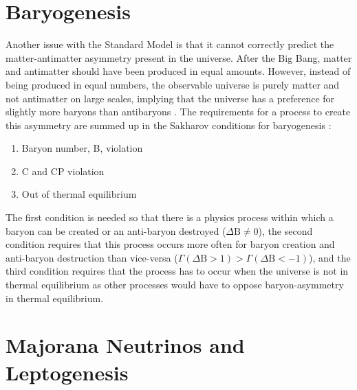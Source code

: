 \section{Baryogenesis}

Another issue with the Standard Model is that it cannot correctly predict the matter-antimatter asymmetry present in the universe. After the Big Bang, matter and antimatter should have been produced in equal amounts. However, instead of being produced in equal numbers, the observable universe is purely matter and not antimatter on large scales, implying that the universe has a preference for slightly more baryons than antibaryons \cite{Canetti:2012zc}. The requirements for a process to create this asymmetry are summed up in the Sakharov conditions for baryogenesis \cite{Sakharov:1967dj}:
\begin{enumerate}
\item Baryon number, B, violation
\item C and CP violation
\item Out of thermal equilibrium
\end{enumerate}
The first condition is needed so that there is a physics process within which a baryon can be created or an anti-baryon destroyed ($\Delta \textrm{B}\neq0$), the second condition requires that this process occurs more often for baryon creation and anti-baryon destruction than vice-versa ($\Gamma(\Delta \textrm{B}>1) > \Gamma(\Delta \textrm{B}<-1)$), and the third condition requires that the process has to occur when the universe is not in thermal equilibrium as other processes would have to oppose baryon-asymmetry in thermal equilibrium.

\section{Majorana Neutrinos and Leptogenesis}


